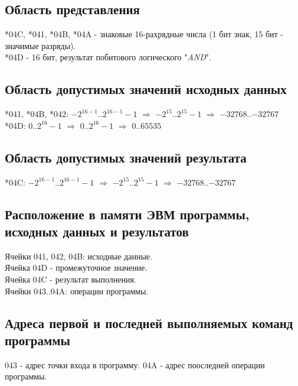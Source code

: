 \documentclass[11pt]{article}
\begin{document}
\subsection{Область представления}
\label{sec:org8e205cb}
*04C, *041, *04B, *04A - знаковые 16-рахрядные числа (1 бит знак, 15 бит - значимые разряды).\\
*04D - 16 бит, результат побитового логического "\emph{AND}".

\subsection{Область допустимых значений исходных данных}
\label{sec:orgb485c8c}
*041, *04B, *042: \(-2^{16-1}\)..\(2^{16-1}-1\)
\(\Rightarrow\) \(-2^{15}\)..\(2^{15}-1\)
\(\Rightarrow\) \(-32768\)..\(-32767\)\\
*04D: \(0\)..\(2^{16}-1\)
\(\Rightarrow\) \(0\)..\(2^{16}-1\)
\(\Rightarrow\) \(0\)..\(65535\)

\subsection{Область допустимых значений результата}
\label{sec:org8bfa7f5}
*04C: \(-2^{16-1}\)..\(2^{16-1}-1\)
\(\Rightarrow\) \(-2^{15}\)..\(2^{15}-1\)
\(\Rightarrow\) \(-32768\)..\(-32767\)

\subsection{Расположение в памяти ЭВМ программы, исходных данных и результатов}
\label{sec:orgadd9fab}
Ячейки 041, 042, 04B: исходные данные.\\
Ячейка 04D - промежуточное значение.\\
Ячейка 04C - результат выполнения.\\
Ячейки 043..04A: операции программы. 

\subsection{Адреса первой и последней выполняемых команд программы}
\label{sec:org6547f23}
043 - адрес точки входа в программу.
04A - адрес пооследней операции программы.
\end{document}
